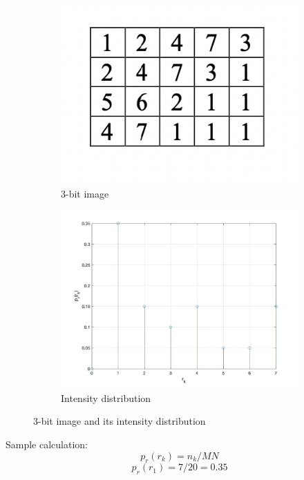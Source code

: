 \documentclass[conference]{IEEEtran}
\begin{document}
\begin{figure}[h!]
\centering
\begin{subfigure}[b]{0.4\linewidth}
\includegraphics[width=\linewidth]{images/img24.jpg}
\caption{3-bit image}
\end{subfigure}
\begin{subfigure}[b]{0.4\linewidth}
\includegraphics[width=\linewidth]{images/img23.jpg}
\caption{Intensity distribution}
\end{subfigure}
\caption{3-bit image and its intensity distribution}
\label{fig: Intensity distribution}
\end{figure}

Sample calculation:
\[p_r(r_k)=n_k/MN\]
\[p_r(r_1)=7/20=0.35\]
\end{document}
